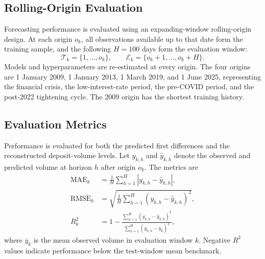 \documentclass[11pt,a4paper]{article}
\begin{document}
\subsection{Rolling-Origin Evaluation}
\label{subsec:rolling_evaluation}

Forecasting performance is evaluated using an expanding-window rolling-origin
design. At each origin \(o_k\), all observations available up to that date form
the training sample, and the following \(H=100\) days form the evaluation
window:
\begin{equation*}
    \mathcal{T}_k=\{1,\ldots,o_k\},
    \qquad
    \mathcal{E}_k=\{o_k+1,\ldots,o_k+H\}.
\end{equation*}
Models and hyperparameters are re-estimated at every origin. The four origins
are 1 January 2009, 1 January 2013, 1 March 2019, and 1 June 2025, representing
the financial crisis, the low-interest-rate period, the pre-COVID period, and
the post-2022 tightening cycle. The 2009 origin has the shortest training
history.

\subsection{Evaluation Metrics}
\label{subsec:evaluation_metrics}

Performance is evaluated for both the predicted first differences and the
reconstructed deposit-volume levels. Let \(y_{k,h}\) and \(\widehat{y}_{k,h}\)
denote the observed and predicted volume at horizon \(h\) after origin
\(o_k\). The metrics are
\begin{align*}
    \operatorname{MAE}_k
    &=
    \frac{1}{H}
    \sum_{h=1}^{H}
    \left|y_{k,h}-\widehat{y}_{k,h}\right|, \\
    \operatorname{RMSE}_k
    &=
    \sqrt{
        \frac{1}{H}
        \sum_{h=1}^{H}
        \left(y_{k,h}-\widehat{y}_{k,h}\right)^2
    }, \\
    R_k^2
    &=
    1-
    \frac{
        \sum_{h=1}^{H}
        \left(y_{k,h}-\widehat{y}_{k,h}\right)^2
    }{
        \sum_{h=1}^{H}
        \left(y_{k,h}-\overline{y}_k\right)^2
    },
\end{align*}
where \(\overline{y}_k\) is the mean observed volume in evaluation window
\(k\). Negative \(R^2\) values indicate performance below the test-window mean
benchmark.
\end{document}
